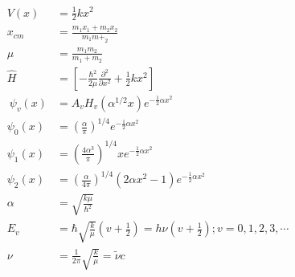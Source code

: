\begin{align*}
V\left(x\right)&=\frac{1}{2}kx^2\\
x_{cm}&=\frac{m_1x_1+m_2x_2}{m_1m+_2}\\
\mu&=\frac{m_1m_2}{m_1+m_2}\\
\hat{H}&=\left[-\frac{\hbar^2}{2\mu} \frac{\partial^2}{\partial x^2}+ \frac{1}{2}kx^2\right]\\\
\psi_v\left(x\right)&=A_vH_v\left(\alpha^{1/2}x\right)e^{-\frac{1}{2}\alpha x^2}\\
\psi_0\left(x\right)&=\left(\frac{\alpha}{\pi}\right)^{1/4}e^{-\frac{1}{2}\alpha x^2}\\
\psi_1\left(x\right)&=\left(\frac{4\alpha^3}{\pi}\right)^{1/4}xe^{-\frac{1}{2}\alpha x^2}\\
\psi_2\left(x\right)&=\left(\frac{\alpha}{4\pi}\right)^{1/4}\left(2\alpha x^2-1\right)e^{-\frac{1}{2}\alpha x^2}\\
\alpha&=\sqrt{\frac{k\mu}{\hbar^2}}\\
E_v&=\hbar\sqrt{\frac{k}{\mu}}\left(v+\frac{1}{2}\right)=h\nu\left(v+\frac{1}{2}\right); v = 0, 1, 2, 3, \cdots\\
\nu&=\frac{1}{2\pi}\sqrt{\frac{k}{\mu}}=\tilde{\nu}c\\
\end{align*}

